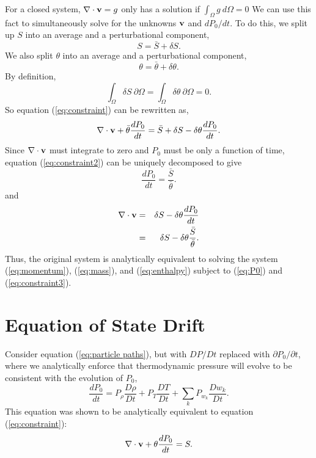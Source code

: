 \documentclass[final]{siamltex}
\def\vb {{\bf v}}
\begin{document}
For a closed system, $\nabla \cdot \vb = g$ only has a solution if $\int_\Omega g~d\Omega = 0$
We can use this fact to simultaneously solve for the unknowns
$\vb$ and $dP_0/dt$.
To do this, we split up $S$ into an average and a perturbational component,
\begin{equation}
S = \bar{S} + \delta S.
\end{equation}
We also
split $\theta$ into an average and a perturbational component,
\begin{equation}
\theta = \bar{\theta} + \delta\theta.
\end{equation}
By definition,
\begin{equation}
\int_{\Omega} \delta S ~\partial\Omega = \int_{\Omega} \delta \theta ~\partial\Omega = 0.\label{eq:zero int}
\end{equation}
So equation (\ref{eq:constraint}) can be rewritten as,
\begin{equation}
\nabla\cdot\vb + \bar{\theta}\frac{dP_0}{d t} 
= \bar{S} + \delta S -
\delta\theta\frac{dP_0}{d t}.\label{eq:constraint2}
\end{equation}
Since $\nabla \cdot \vb$ must integrate to zero and $P_0$ must be only a function of time,
equation (\ref{eq:constraint2}) can be uniquely decomposed to give
\begin{equation}
\frac{dP_0}{dt} = \frac{\bar{S}}{\bar{\theta}}.\label{eq:P0}
\end{equation}
and
\begin{eqnarray}
\nabla\cdot\vb &=& \delta S - \delta\theta\frac{dP_0}{dt} \nonumber\\
&=& \delta S - \delta\theta\frac{\bar{S}}{\bar{\theta}}.\label{eq:constraint3}
\end{eqnarray}
Thus, the original system is analytically equivalent to solving the system (\ref{eq:momentum}), (\ref{eq:mass}), and (\ref{eq:enthalpy})
subject to (\ref{eq:P0}) and (\ref{eq:constraint3}).

\section{Equation of State Drift}
Consider equation (\ref{eq:particle paths}), but with
$DP/Dt$ replaced with $\partial P_0/\partial t$,
where we analytically enforce that
thermodynamic pressure will evolve to be consistent with the evolution of $P_0$,
\begin{equation}
\frac{dP_0}{dt} = P_\rho\frac{D\rho}{Dt} + P_T\frac{DT}{Dt} + \sum_kP_{w_k}\frac{Dw_k}{Dt}.
\end{equation}
This equation was shown to be analytically equivalent to equation (\ref{eq:constraint}):
\begin{equation}
\nabla\cdot\vb + \theta\frac{dP_0}{dt} = S.
\end{equation}
\end{document}
